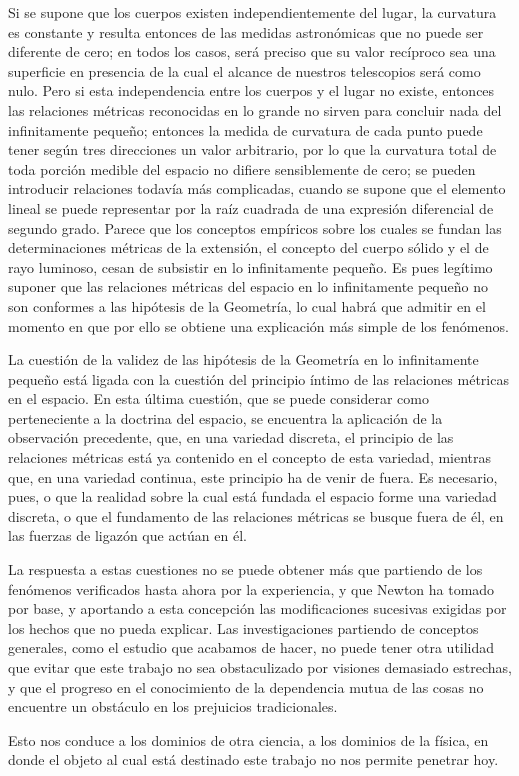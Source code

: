 \documentclass[a4paper, 12pt]{article}
\begin{document}
Si se supone que los cuerpos existen independientemente del lugar, la curvatura es constante y resulta entonces de las medidas astronómicas que no puede ser diferente de cero; en todos los casos, será preciso que su valor recíproco sea una superficie en presencia de la cual el alcance de nuestros telescopios será como nulo. Pero si esta independencia entre los cuerpos y el lugar no existe, entonces las relaciones métricas reconocidas en lo grande no sirven para concluir nada del infinitamente pequeño; entonces la medida de curvatura de cada punto puede tener según tres direcciones un valor arbitrario, por lo que la curvatura total de toda porción medible del espacio no difiere sensiblemente de cero; se pueden introducir relaciones todavía más complicadas, cuando se supone que el elemento lineal se puede representar por la raíz cuadrada de una expresión diferencial de segundo grado. Parece que los conceptos empíricos sobre los cuales se fundan las determinaciones métricas de la extensión, el concepto del cuerpo sólido y el
de rayo luminoso, cesan de subsistir en lo infinitamente pequeño.
Es pues legítimo suponer que las relaciones métricas del espacio
en lo infinitamente pequeño no son conformes a las hipótesis de
la Geometría, lo cual habrá que admitir en el momento en que por
ello se obtiene una explicación más simple de los fenómenos.

La cuestión de la validez de las hipótesis de la Geometría en lo infinitamente pequeño está ligada con la cuestión del principio íntimo de las relaciones métricas en el espacio. En esta última cuestión, que se puede considerar como perteneciente a la doctrina del espacio, se encuentra la aplicación de la observación precedente, que, en una variedad discreta, el principio de las relaciones métricas está ya contenido en el concepto de esta variedad, mientras	que, en una variedad continua, este principio ha de venir de fuera. 	Es necesario, pues, o que la realidad sobre la cual está fundada el
espacio forme una variedad discreta, o que el fundamento de las
relaciones métricas se busque fuera de él, en las fuerzas de ligazón
que actúan en él.
	
La respuesta a estas cuestiones no se puede obtener más que
partiendo de los fenómenos verificados hasta ahora por la experiencia, y que Newton ha tomado por base, y aportando a esta
concepción las modificaciones sucesivas exigidas por los hechos que
no pueda explicar. Las investigaciones partiendo de conceptos generales, como el estudio que acabamos de hacer, no puede tener
otra utilidad que evitar que este trabajo no sea obstaculizado por
visiones demasiado estrechas, y que el progreso en el conocimiento
de la dependencia mutua de las cosas no encuentre un obstáculo
en los prejuicios tradicionales.	
	
Esto nos conduce a los dominios de otra ciencia, a los dominios
de la física, en donde el objeto al cual está destinado este trabajo
no nos permite penetrar hoy.
\end{document}
